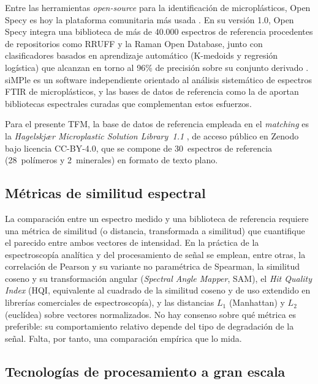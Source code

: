 Entre las herramientas \textit{open-source} para la identificación de microplásticos, Open Specy es hoy la plataforma comunitaria más usada \citep{cowger2021openspecy}. En su versión 1.0, Open Specy integra una biblioteca de más de 40.000 espectros de referencia procedentes de repositorios como RRUFF y la Raman Open Database, junto con clasificadores basados en aprendizaje automático (K-medoids y regresión logística) que alcanzan en torno al 96\% de precisión sobre su conjunto derivado \citep{cowger2025openspecy}. siMPle \citep{primpke2020simple} es un software independiente orientado al análisis sistemático de espectros FTIR de microplásticos, y las bases de datos de referencia como la de \citet{primpke2018reference} aportan bibliotecas espectrales curadas que complementan estos esfuerzos.

Para el presente TFM, la base de datos de referencia empleada en el \textit{matching} es la \emph{Hagelskjær Microplastic Solution Library~1.1} \citep{hagelskjaer2025library}, de acceso público en Zenodo bajo licencia CC-BY-4.0, que se compone de 30~espectros de referencia (28~polímeros y 2~minerales) en formato de texto plano.

\subsection{Métricas de similitud espectral}

La comparación entre un espectro medido y una biblioteca de referencia requiere una métrica de similitud (o distancia, transformada a similitud) que cuantifique el parecido entre ambos vectores de intensidad. En la práctica de la espectroscopía analítica y del procesamiento de señal se emplean, entre otras, la correlación de Pearson y su variante no paramétrica de Spearman, la similitud coseno y su transformación angular (\emph{Spectral Angle Mapper}, SAM), el \emph{Hit Quality Index} (HQI, equivalente al cuadrado de la similitud coseno y de uso extendido en librerías comerciales de espectroscopía), y las distancias $L_1$ (Manhattan) y $L_2$ (euclídea) sobre vectores normalizados. No hay consenso sobre qué métrica es preferible: su comportamiento relativo depende del tipo de degradación de la señal. Falta, por tanto, una comparación empírica que lo mida.

\subsection{Tecnologías de procesamiento a gran escala}

